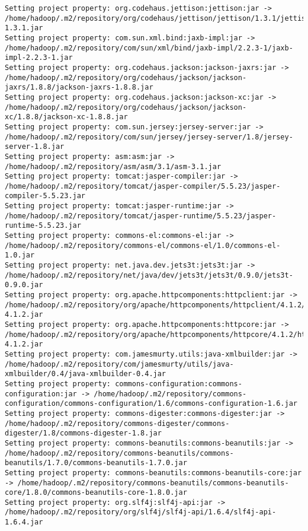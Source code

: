 \begin{verbatim}
Setting project property: org.codehaus.jettison:jettison:jar -> /home/hadoop/.m2/repository/org/codehaus/jettison/jettison/1.3.1/jettison-1.3.1.jar
Setting project property: com.sun.xml.bind:jaxb-impl:jar -> /home/hadoop/.m2/repository/com/sun/xml/bind/jaxb-impl/2.2.3-1/jaxb-impl-2.2.3-1.jar
Setting project property: org.codehaus.jackson:jackson-jaxrs:jar -> /home/hadoop/.m2/repository/org/codehaus/jackson/jackson-jaxrs/1.8.8/jackson-jaxrs-1.8.8.jar
Setting project property: org.codehaus.jackson:jackson-xc:jar -> /home/hadoop/.m2/repository/org/codehaus/jackson/jackson-xc/1.8.8/jackson-xc-1.8.8.jar
Setting project property: com.sun.jersey:jersey-server:jar -> /home/hadoop/.m2/repository/com/sun/jersey/jersey-server/1.8/jersey-server-1.8.jar
Setting project property: asm:asm:jar -> /home/hadoop/.m2/repository/asm/asm/3.1/asm-3.1.jar
Setting project property: tomcat:jasper-compiler:jar -> /home/hadoop/.m2/repository/tomcat/jasper-compiler/5.5.23/jasper-compiler-5.5.23.jar
Setting project property: tomcat:jasper-runtime:jar -> /home/hadoop/.m2/repository/tomcat/jasper-runtime/5.5.23/jasper-runtime-5.5.23.jar
Setting project property: commons-el:commons-el:jar -> /home/hadoop/.m2/repository/commons-el/commons-el/1.0/commons-el-1.0.jar
Setting project property: net.java.dev.jets3t:jets3t:jar -> /home/hadoop/.m2/repository/net/java/dev/jets3t/jets3t/0.9.0/jets3t-0.9.0.jar
Setting project property: org.apache.httpcomponents:httpclient:jar -> /home/hadoop/.m2/repository/org/apache/httpcomponents/httpclient/4.1.2/httpclient-4.1.2.jar
Setting project property: org.apache.httpcomponents:httpcore:jar -> /home/hadoop/.m2/repository/org/apache/httpcomponents/httpcore/4.1.2/httpcore-4.1.2.jar
Setting project property: com.jamesmurty.utils:java-xmlbuilder:jar -> /home/hadoop/.m2/repository/com/jamesmurty/utils/java-xmlbuilder/0.4/java-xmlbuilder-0.4.jar
Setting project property: commons-configuration:commons-configuration:jar -> /home/hadoop/.m2/repository/commons-configuration/commons-configuration/1.6/commons-configuration-1.6.jar
Setting project property: commons-digester:commons-digester:jar -> /home/hadoop/.m2/repository/commons-digester/commons-digester/1.8/commons-digester-1.8.jar
Setting project property: commons-beanutils:commons-beanutils:jar -> /home/hadoop/.m2/repository/commons-beanutils/commons-beanutils/1.7.0/commons-beanutils-1.7.0.jar
Setting project property: commons-beanutils:commons-beanutils-core:jar -> /home/hadoop/.m2/repository/commons-beanutils/commons-beanutils-core/1.8.0/commons-beanutils-core-1.8.0.jar
Setting project property: org.slf4j:slf4j-api:jar -> /home/hadoop/.m2/repository/org/slf4j/slf4j-api/1.6.4/slf4j-api-1.6.4.jar

\end{verbatim}
